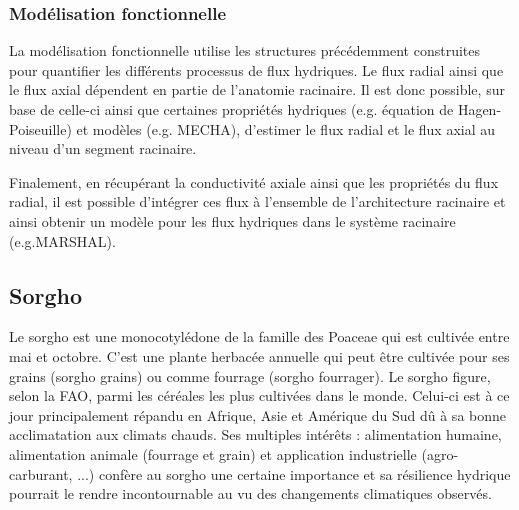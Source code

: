 \subsubsection{Modélisation fonctionnelle}

La modélisation fonctionnelle utilise les structures précédemment construites pour quantifier les différents processus de flux hydriques.
Le flux radial ainsi que le flux axial dépendent en partie de l'anatomie racinaire.
Il est donc possible, sur base de celle-ci ainsi que certaines propriétés hydriques (e.g. équation de Hagen-Poiseuille) et modèles (e.g. MECHA), d'estimer le flux radial et le flux axial au niveau d'un segment racinaire.

Finalement, en récupérant la conductivité axiale ainsi que les propriétés du flux radial, il est possible d'intégrer ces flux à l'ensemble de l'architecture racinaire et ainsi obtenir un modèle pour les flux hydriques dans le système racinaire (e.g.MARSHAL).

\subsection{Sorgho}
Le sorgho est une monocotylédone de la famille des Poaceae qui est cultivée entre mai et octobre.
C'est une plante herbacée annuelle qui peut être cultivée pour ses grains (sorgho grains) ou comme fourrage (sorgho fourrager).
Le sorgho figure, selon la FAO, parmi les céréales les plus cultivées dans le monde. 
Celui-ci est à ce jour principalement répandu en Afrique, Asie et Amérique du Sud dû à sa bonne acclimatation aux climats chauds.
Ses multiples intérêts : alimentation humaine, alimentation animale (fourrage et grain) et application industrielle (agro-carburant, ...) confère au sorgho une certaine importance et sa résilience hydrique pourrait le rendre incontournable au vu des changements climatiques observés.
\newline

